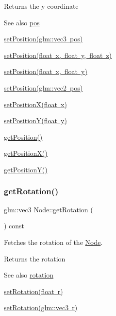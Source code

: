 \begin{DoxyReturn}{Returns}
the y coordinate 
\end{DoxyReturn}
\begin{DoxySeeAlso}{See also}
\mbox{\hyperlink{classsage_1_1Node_a26c32e5ec11e0ed7f33053ecac6830d5}{pos}} 

\mbox{\hyperlink{classsage_1_1Node_a12f5d88d221aa5db70c2bd53f6dc049a}{set\+Position(glm\+::vec3 pos)}} 

\mbox{\hyperlink{classsage_1_1Node_ad9899110e543c6b16997512e47c142c9}{set\+Position(float x, float y, float z)}} 

\mbox{\hyperlink{classsage_1_1Node_aaa8545c103ef1b35e5076dbedab93af5}{set\+Position(float x, float y)}} 

\mbox{\hyperlink{classsage_1_1Node_ae2731cefe38e706c2bf21afae6da18b3}{set\+Position(glm\+::vec2 pos)}} 

\mbox{\hyperlink{classsage_1_1Node_ae1dfc73d6122a95778d5d9db3d1fd913}{set\+Position\+X(float x)}} 

\mbox{\hyperlink{classsage_1_1Node_a5c97d36655f0daa71a5f6c715d2b0470}{set\+Position\+Y(float y)}} 

\mbox{\hyperlink{classsage_1_1Node_a11fbdf2a2dcdf8bdc014df65f3003925}{get\+Position()}} 

\mbox{\hyperlink{classsage_1_1Node_a17e92da5beaeb4b299c4e93729a22b1a}{get\+Position\+X()}} 

\mbox{\hyperlink{classsage_1_1Node_a26337a40b7da400233451b71e85759cc}{get\+Position\+Y()}} 
\end{DoxySeeAlso}
\mbox{\label{classsage_1_1Node_aff82a2e9d9add8b8c3633482da5e6d88}} 
\subsubsection{\texorpdfstring{getRotation()}{getRotation()}}
{\footnotesize\ttfamily glm\+::vec3 Node\+::get\+Rotation (\begin{DoxyParamCaption}{ }\end{DoxyParamCaption}) const}



Fetches the rotation of the \mbox{\hyperlink{classsage_1_1Node}{Node}}. 

\begin{DoxyReturn}{Returns}
the rotation 
\end{DoxyReturn}
\begin{DoxySeeAlso}{See also}
\mbox{\hyperlink{classsage_1_1Node_a7f338279775e186e48336145a5d69241}{rotation}} 

\mbox{\hyperlink{classsage_1_1Node_a422e877f5a830ad4d50b8e13250ee553}{set\+Rotation(float r)}} 

\mbox{\hyperlink{classsage_1_1Node_aec0a7e0159605b7701a8b156d78ef967}{set\+Rotation(glm\+::vec3 r)}} 
\end{DoxySeeAlso}
\mbox{\label{classsage_1_1Node_ac41e15cac1e23a4c48798291c70dcdd8}} 
